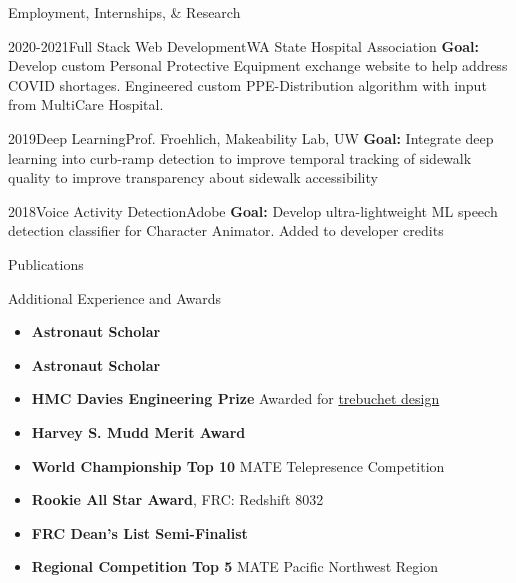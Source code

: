 \documentclass[]{mcdowellcv}
\begin{document}
\begin{cvsection}{Employment, Internships, \& Research}
	\begin{cvsubsection}{2020-2021}{Full Stack Web Development}{WA State Hospital Association}
		\textbf{Goal:} Develop custom Personal Protective Equipment exchange website to help address COVID shortages. Engineered custom PPE-Distribution algorithm with input from  MultiCare Hospital.
	\end{cvsubsection}

	\begin{cvsubsection}{2019}{Deep Learning}{Prof. Froehlich, Makeability Lab, UW}
		\textbf{Goal:} Integrate deep learning into curb-ramp detection to improve temporal tracking of sidewalk quality to improve transparency about sidewalk accessibility
	\end{cvsubsection}

	\begin{cvsubsection}{2018}{Voice Activity Detection}{Adobe}
		\textbf{Goal:} Develop ultra-lightweight ML speech detection classifier for Character Animator. Added to developer credits
	\end{cvsubsection}
\end{cvsection}

\begin{cvsection}{Publications}


	

\end{cvsection}

\begin{cvsection}{Additional Experience and Awards}
	\begin{cvsubsection}{}{}{}
		\begin{itemize}
			\item[2025] \textbf{Astronaut Scholar}
			\item[2024] \textbf{Astronaut Scholar}
			\item[2023] \textbf{HMC Davies Engineering Prize} Awarded for \hyperlink{trebuchet_design}{trebuchet design}
			\item[2022] \textbf{Harvey S. Mudd Merit Award}
			\item[2021] \textbf{World Championship Top 10} MATE  Telepresence Competition
			\item[2020] \textbf{Rookie All Star Award}, FRC: Redshift 8032
			\item[2020] \textbf{FRC Dean's List Semi-Finalist}
			\item[2018] \textbf{Regional Competition Top 5} MATE Pacific Northwest Region
		\end{itemize}
	\end{cvsubsection}
\end{cvsection}
\end{document}
